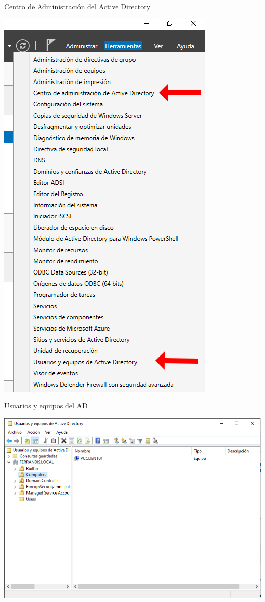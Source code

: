 \documentclass[
  a4paper,
]{article}
\begin{document}
Centro de Administración del Active Directory

\includegraphics{png/administradordelservidorADDS.png}

Usuarios y equipos del AD

\includegraphics{png/usuariosyequiposactivedirectory.png}
\end{document}
